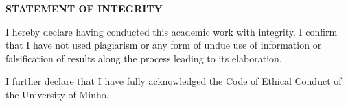 
\centerline{\textbf{STATEMENT OF INTEGRITY}}

\bigskip

\bigskip

\noindent I hereby declare having conducted this academic work with integrity. I confirm that I have not used plagiarism or any form of undue use of information or falsification of results along the process leading to its elaboration.
 
\noindent I further declare that I have fully acknowledged the Code of Ethical Conduct of the University of Minho.
